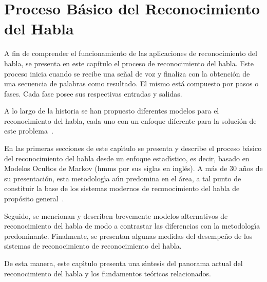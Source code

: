 \chapter{Proceso B\'{a}sico del Reconocimiento del Habla}
\label{sec:proceso}

A fin de comprender el funcionamiento de las aplicaciones de reconocimiento del habla, se presenta en este capítulo
el proceso de reconocimiento del habla. Este proceso inicia cuando se recibe una se\~nal de voz y finaliza con
la obtención de una secuencia de palabras como resultado. El mismo est\'a compuesto por pasos o fases. 
Cada fase posee sus respectivas entradas y salidas.

A lo largo de la historia se han propuesto diferentes modelos para el reconocimiento del habla, cada uno
con un enfoque diferente para la soluci\'on de este \mbox{problema \cite{VimalaReview2012}}. 

En las primeras secciones de este cap{\'\i}tulo se presenta y describe el proceso b\'asico del 
reconocimiento del habla desde un enfoque estad{\'\i}stico, es decir, basado en Modelos Ocultos de 
Markov (\gls{hmm}s por sus siglas en ingl\'es). 
A m\'as de 30 a\~nos de su presentaci\'on, esta metodolog{\'\i}a a\'un predomina en el \'area,
a tal punto de constituir la base de los sistemas modernos de reconocimiento del habla de 
prop\'osito \mbox{general \cite{BakerResearch2009, VimalaReview2012}}.

Seguido, se mencionan y describen brevemente modelos alternativos de reconocimiento del habla de modo 
a contrastar las diferencias con la metodolog{\'\i}a predominante. Finalmente, se presentan algunas medidas del 
desempe\~no de los sistemas de reconocimiento de reconocimiento del habla.

De esta manera, este cap{\'\i}tulo presenta una s{\'\i}ntesis del panorama actual del reconocimiento del habla y
los fundamentos te\'oricos relacionados.






